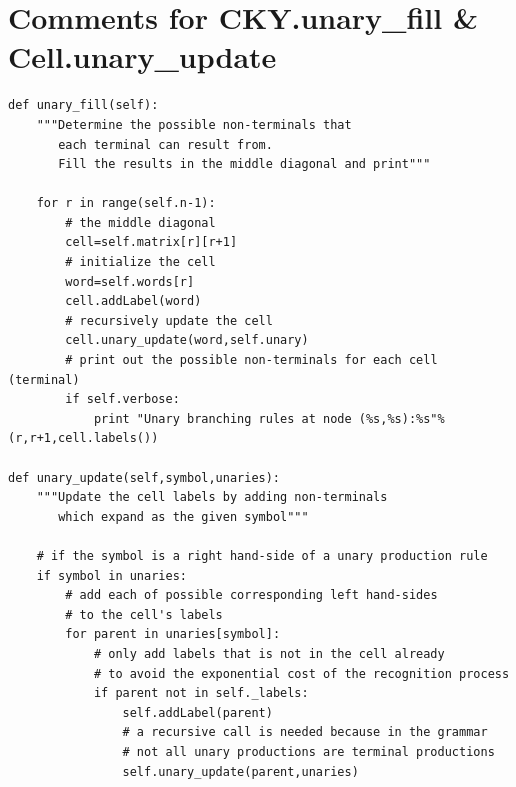 \documentclass{article}
\begin{document}
\hfill \break


\section{Comments for CKY.unary\_fill \& Cell.unary\_update}
\begin{lstlisting}
def unary_fill(self):
	"""Determine the possible non-terminals that 
	   each terminal can result from. 
	   Fill the results in the middle diagonal and print"""
	
	for r in range(self.n-1):
		# the middle diagonal
		cell=self.matrix[r][r+1]
		# initialize the cell
		word=self.words[r]
		cell.addLabel(word)
		# recursively update the cell
		cell.unary_update(word,self.unary)
		# print out the possible non-terminals for each cell (terminal)
		if self.verbose:
			print "Unary branching rules at node (%s,%s):%s"%(r,r+1,cell.labels())
			
def unary_update(self,symbol,unaries):
	"""Update the cell labels by adding non-terminals 
	   which expand as the given symbol"""
	   
	# if the symbol is a right hand-side of a unary production rule
	if symbol in unaries:
		# add each of possible corresponding left hand-sides
		# to the cell's labels
		for parent in unaries[symbol]:
			# only add labels that is not in the cell already
			# to avoid the exponential cost of the recognition process
			if parent not in self._labels:
				self.addLabel(parent)
				# a recursive call is needed because in the grammar 
				# not all unary productions are terminal productions
				self.unary_update(parent,unaries)
\end{lstlisting}

\hfill \break
\end{document}
